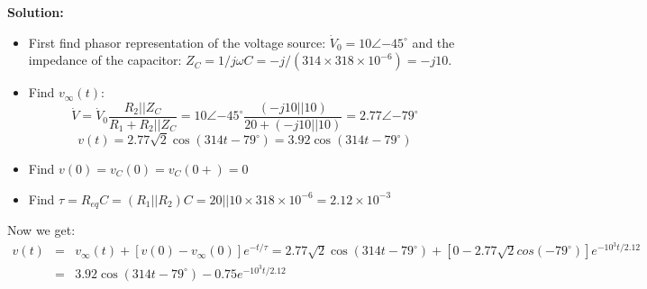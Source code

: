 {\bf Solution:} 
\begin{itemize}
\item First find phasor representation of the voltage source:
$\dot{V}_0=10\angle{-45^{\circ}}$ and the impedance of the capacitor:
$Z_C=1/j\omega C=-j/(314\times 318\times 10^{-6})=-j10$. 

\item Find $v_\infty(t)$:
  \[ \dot{V}=\dot{V}_0 \frac{R_2|| Z_C}{R_1+R_2||Z_C}
  =10\angle{-45^\circ}\frac{(-j10 || 10)}{20+(-j10 || 10)}
  =2.77\angle{-79^\circ} \]
  \[ v(t)=2.77\sqrt{2} \cos(314 t-79^\circ)=3.92 \cos(314 t-79^\circ) \]
\item Find $v(0)=v_C(0)=v_C(0+)=0$

\item Find $\tau=R_{eq}C=(R_1||R_2) C=20 || 10 \times 318\times 
  10^{-6}=2.12\times 10^{-3}$
\end{itemize}
Now we get:
\begin{eqnarray}
 v(t)&=&v_\infty(t)+[v(0)-v_\infty(0)]e^{-t/\tau}
  =2.77\sqrt{2} \cos(314 t-79^\circ)+[0-2.77\sqrt{2}cos(-79^\circ)] e^{-10^3 t/2.12}
  \nonumber \\ 
  &=& 3.92 \cos(314 t-79^\circ)-0.75 e^{-10^3 t/2.12}
  \nonumber
\end{eqnarray}

